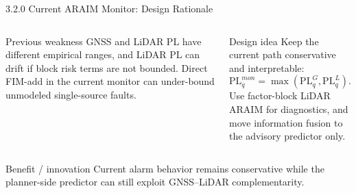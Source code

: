 \documentclass[10pt,aspectratio=169,xcolor=dvipsnames]{beamer}
\newcommand{\PL}{\mathrm{PL}}
\begin{document}
\begin{frame}{3.2.0 Current ARAIM Monitor: Design Rationale}

  \small
  \begin{columns}[T]
    \begin{alertblock}{Previous weakness}
      \footnotesize
      GNSS and LiDAR PL have different empirical ranges, and LiDAR PL can drift if block risk terms are not bounded. Direct FIM-add in the current monitor can under-bound unmodeled single-source faults.
    \end{alertblock}
    \begin{exampleblock}{Design idea}
      \footnotesize
      Keep the current path conservative and interpretable:
      \[
        \PL^{mon}_q=\max(\PL^G_q,\PL^L_q).
      \]
      Use factor-block LiDAR ARAIM for diagnostics, and move information fusion to the advisory predictor only.
    \end{exampleblock}
  \end{columns}
  \begin{block}{Benefit / innovation}
    \footnotesize Current alarm behavior remains conservative while the planner-side predictor can still exploit GNSS--LiDAR complementarity.
  \end{block}

\end{frame}
\end{document}
